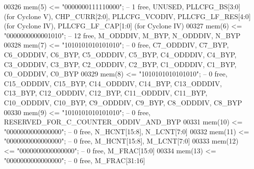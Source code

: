 \begin{DoxyCode}
00326       \textcolor{vhdlchar}{mem}\textcolor{vhdlchar}{(}\textcolor{vhdllogic}{}\textcolor{vhdllogic}{5}\textcolor{vhdlchar}{)}   \textcolor{vhdlchar}{<=} \textcolor{vhdllogic}{"0000000111110000"};\textcolor{keyword}{ -- 1  free, UNUSED, PLLCFG\_BS[3:0] (for Cyclone V), CHP\_CURR[2:0],
       PLLCFG\_VCODIV, PLLCFG\_LF\_RES[4:0] (for Cyclone IV), PLLCFG\_LF\_CAP[1:0] (for Cyclone IV)}
00327       \textcolor{vhdlchar}{mem}\textcolor{vhdlchar}{(}\textcolor{vhdllogic}{}\textcolor{vhdllogic}{6}\textcolor{vhdlchar}{)}   \textcolor{vhdlchar}{<=} \textcolor{vhdllogic}{"0000000000001010"};\textcolor{keyword}{ -- 12 free, M\_ODDDIV, M\_BYP, N\_ODDDIV, N\_BYP}
00328       \textcolor{vhdlchar}{mem}\textcolor{vhdlchar}{(}\textcolor{vhdllogic}{}\textcolor{vhdllogic}{7}\textcolor{vhdlchar}{)}   \textcolor{vhdlchar}{<=} \textcolor{vhdllogic}{"1010101010101010"};\textcolor{keyword}{ -- 0  free,  C7\_ODDDIV,  C7\_BYP,  C6\_ODDDIV,  C6\_BYP,  C5\_ODDDIV, 
       C5\_BYP,  C4\_ODDDIV,  C4\_BYP,  C3\_ODDDIV,  C3\_BYP,  C2\_ODDDIV,  C2\_BYP, C1\_ODDDIV, C1\_BYP, C0\_ODDDIV, C0\_BYP}
00329       \textcolor{vhdlchar}{mem}\textcolor{vhdlchar}{(}\textcolor{vhdllogic}{}\textcolor{vhdllogic}{8}\textcolor{vhdlchar}{)}   \textcolor{vhdlchar}{<=} \textcolor{vhdllogic}{"1010101010101010"};\textcolor{keyword}{ -- 0  free, C15\_ODDDIV, C15\_BYP, C14\_ODDDIV, C14\_BYP, C13\_ODDDIV,
       C13\_BYP, C12\_ODDDIV, C12\_BYP, C11\_ODDDIV, C11\_BYP, C10\_ODDDIV, C10\_BYP, C9\_ODDDIV, C9\_BYP, C8\_ODDDIV, C8\_BYP}
00330       \textcolor{vhdlchar}{mem}\textcolor{vhdlchar}{(}\textcolor{vhdllogic}{}\textcolor{vhdllogic}{9}\textcolor{vhdlchar}{)}   \textcolor{vhdlchar}{<=} \textcolor{vhdllogic}{"1010101010101010"};\textcolor{keyword}{ -- 0  free, RESERVED\_FOR\_C\_COUNTER\_ODDIV\_AND\_BYP}
00331       \textcolor{vhdlchar}{mem}\textcolor{vhdlchar}{(}\textcolor{vhdllogic}{}\textcolor{vhdllogic}{10}\textcolor{vhdlchar}{)}  \textcolor{vhdlchar}{<=} \textcolor{vhdllogic}{"0000000000000000"};\textcolor{keyword}{ -- 0  free, N\_HCNT[15:8], N\_LCNT[7:0]}
00332       \textcolor{vhdlchar}{mem}\textcolor{vhdlchar}{(}\textcolor{vhdllogic}{}\textcolor{vhdllogic}{11}\textcolor{vhdlchar}{)}  \textcolor{vhdlchar}{<=} \textcolor{vhdllogic}{"0000000000000000"};\textcolor{keyword}{ -- 0  free, M\_HCNT[15:8], M\_LCNT[7:0]}
00333       \textcolor{vhdlchar}{mem}\textcolor{vhdlchar}{(}\textcolor{vhdllogic}{}\textcolor{vhdllogic}{12}\textcolor{vhdlchar}{)}  \textcolor{vhdlchar}{<=} \textcolor{vhdllogic}{"0000000000000000"};\textcolor{keyword}{ -- 0  free, M\_FRAC[15:0]}
00334       \textcolor{vhdlchar}{mem}\textcolor{vhdlchar}{(}\textcolor{vhdllogic}{}\textcolor{vhdllogic}{13}\textcolor{vhdlchar}{)}  \textcolor{vhdlchar}{<=} \textcolor{vhdllogic}{"0000000000000000"};\textcolor{keyword}{ -- 0  free, M\_FRAC[31:16]}

\end{DoxyCode}
